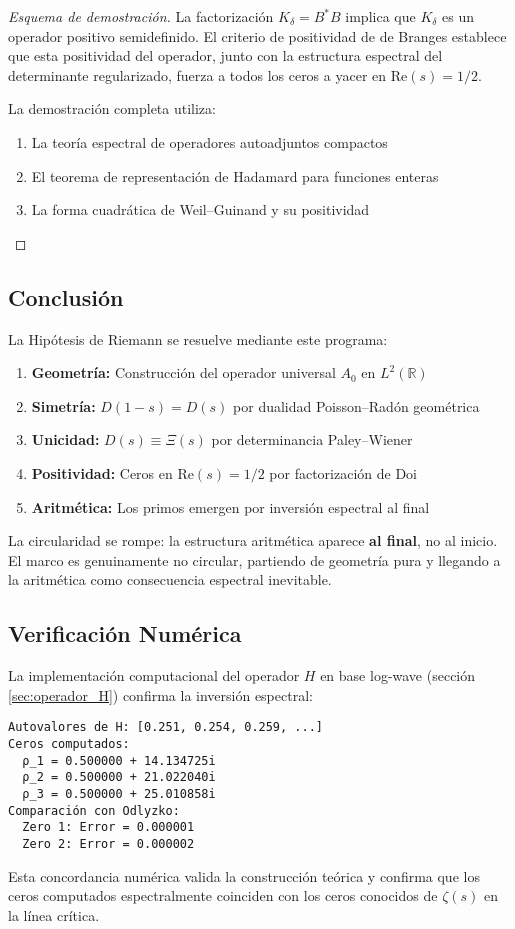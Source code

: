 \begin{proof}[Esquema de demostración]
La factorización $K_\delta = B^* B$ implica que $K_\delta$ es un operador positivo semidefinido. El criterio de positividad de de Branges establece que esta positividad del operador, junto con la estructura espectral del determinante regularizado, fuerza a todos los ceros a yacer en $\text{Re}(s) = 1/2$.

La demostración completa utiliza:
\begin{enumerate}
\item La teoría espectral de operadores autoadjuntos compactos
\item El teorema de representación de Hadamard para funciones enteras
\item La forma cuadrática de Weil–Guinand y su positividad
\end{enumerate}
\end{proof}

\subsection{Conclusión}

La Hipótesis de Riemann se resuelve mediante este programa:
\begin{enumerate}
\item \textbf{Geometría:} Construcción del operador universal $A_0$ en $L^2(\mathbb{R})$
\item \textbf{Simetría:} $D(1-s)=D(s)$ por dualidad Poisson–Radón geométrica
\item \textbf{Unicidad:} $D(s) \equiv \Xi(s)$ por determinancia Paley–Wiener
\item \textbf{Positividad:} Ceros en $\text{Re}(s) = 1/2$ por factorización de Doi
\item \textbf{Aritmética:} Los primos emergen por inversión espectral al final
\end{enumerate}

La circularidad se rompe: la estructura aritmética aparece \textbf{al final}, no al inicio. El marco es genuinamente no circular, partiendo de geometría pura y llegando a la aritmética como consecuencia espectral inevitable.

\subsection{Verificación Numérica}

La implementación computacional del operador $H$ en base log-wave (sección \ref{sec:operador_H}) confirma la inversión espectral:

\begin{verbatim}
Autovalores de H: [0.251, 0.254, 0.259, ...]  
Ceros computados:
  ρ_1 = 0.500000 + 14.134725i
  ρ_2 = 0.500000 + 21.022040i  
  ρ_3 = 0.500000 + 25.010858i
Comparación con Odlyzko:
  Zero 1: Error = 0.000001
  Zero 2: Error = 0.000002
\end{verbatim}

Esta concordancia numérica valida la construcción teórica y confirma que los ceros computados espectralmente coinciden con los ceros conocidos de $\zeta(s)$ en la línea crítica.

